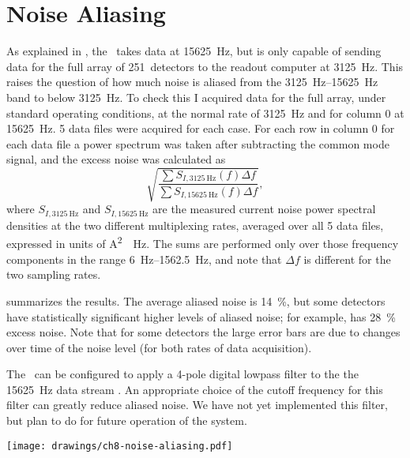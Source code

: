 \section{Noise Aliasing}

As explained in , the \MCE\ takes data at \SI{15625}{\hertz}, but is only capable of sending data for the full array of 251~detectors to the readout computer at \SI{3125}{\hertz}.
This raises the question of how much noise is aliased from the \SIrange{3125}{15625}{\hertz} band to below \SI{3125}{\hertz}.
To check this I acquired data for the full array, under standard operating conditions, at the normal rate of \SI{3125}{\hertz} and for column 0 at \SI{15625}{\hertz}.
5 data files were acquired for each case. For each row in column 0 for each data file a power spectrum was taken after subtracting the common mode signal, and the excess noise was calculated as
\begin{equation}
  \sqrt{  \frac{ \sum S_{I,\SI{3125}{\Hz}}(f) \Delta f }
               { \sum S_{I,\SI{15625}{\Hz}}(f) \Delta f }},
\end{equation}
where $S_{I,\SI{3125}{\Hz}}$ and $S_{I,\SI{15625}{\Hz}}$ are the measured current noise power spectral densities at the two different multiplexing rates, averaged over all 5 data files, expressed in units of \si{\A^2 \per \Hz}.
The sums are performed only over those frequency components in the range \SIrange{6}{1562.5}{\Hz}, and note that $\Delta f$ is different for the two sampling rates.

 summarizes the results.
The average aliased noise is \SI{14}{\percent}, but some detectors have statistically significant higher levels of aliased noise; for example,  has \SI{28}{\percent} excess noise.
Note that for some detectors the large error bars are due to changes over time of the noise level (for both rates of data acquisition).

The \MCE\ can be configured to apply a 4-pole digital lowpass filter to the the \SI{15625}{\Hz} data stream \cite{mce_team_digital_????}.
An appropriate choice of the cutoff frequency for this filter can greatly reduce aliased noise.
We have not yet implemented this filter, but plan to do for future operation of the system.

\begin{figure*}
  \centering
\texttt{[image: drawings/ch8-noise-aliasing.pdf]}
\caption{%
\textbf{Top}
Plot showing fractional excess noise (see text for definition) due to noise aliasing for all rows of column 0.
The error bars are for \SI{95}{\percent} confidence intervals, and the average excess noise is \SI{14}{\percent}.
\textbf{Bottom}
Sample power spectra at \SI{3125}{\hertz} and \SI{15625}{\hertz} for .
For this detector the excess noise is \SI{17}{\percent}.
}
\label{fig:ch8-noise-aliasing}
\end{figure*}
